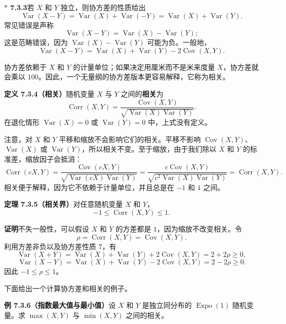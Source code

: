 \documentclass[UTF8,12pt,a4paper,fontset=fandol]{ctexart}
\newcommand{\biohazard}{\ensuremath{\ast}}
\begin{document}
\noindent\textbf{$\biohazard$ 7.3.3}\quad 若 $X$ 和 $Y$ 独立，则协方差的性质给出
\[
  \operatorname{Var}(X-Y)=\operatorname{Var}(X)+\operatorname{Var}(-Y)
  =\operatorname{Var}(X)+\operatorname{Var}(Y).
\]
常见错误是声称
\[
  \operatorname{Var}(X-Y)=\operatorname{Var}(X)-\operatorname{Var}(Y);
\]
这是范畴错误，因为 $\operatorname{Var}(X)-\operatorname{Var}(Y)$ 可能为负。一般地，
\[
  \operatorname{Var}(X-Y)=\operatorname{Var}(X)+\operatorname{Var}(Y)-2\operatorname{Cov}(X,Y).
\]

协方差依赖于 $X$ 和 $Y$ 的计量单位；如果决定用厘米而不是米来度量 $X$，协方差就会乘以 $100$。因此，一个无量纲的协方差版本更容易解释，它称为相关。

\noindent\textbf{定义 7.3.4（相关）}\quad 随机变量 $X$ 与 $Y$ 之间的\textbf{相关}为
\[
  \operatorname{Corr}(X,Y)
  =\frac{\operatorname{Cov}(X,Y)}
  {\sqrt{\operatorname{Var}(X)\operatorname{Var}(Y)}}.
\]
在退化情形 $\operatorname{Var}(X)=0$ 或 $\operatorname{Var}(Y)=0$ 中，上式没有定义。

注意，对 $X$ 和 $Y$ 平移和缩放不会影响它们的相关。平移不影响 $\operatorname{Cov}(X,Y)$、$\operatorname{Var}(X)$ 或 $\operatorname{Var}(Y)$，所以相关不变。至于缩放，由于我们除以 $X$ 和 $Y$ 的标准差，缩放因子会抵消：
\[
  \operatorname{Corr}(cX,Y)
  =\frac{\operatorname{Cov}(cX,Y)}
  {\sqrt{\operatorname{Var}(cX)\operatorname{Var}(Y)}}
  =\frac{c\operatorname{Cov}(X,Y)}
  {\sqrt{c^2\operatorname{Var}(X)\operatorname{Var}(Y)}}
  =\operatorname{Corr}(X,Y).
\]
相关便于解释，因为它不依赖于计量单位，并且总是在 $-1$ 和 $1$ 之间。

\noindent\textbf{定理 7.3.5（相关界）}\quad 对任意随机变量 $X$ 和 $Y$，
\[
  -1\le \operatorname{Corr}(X,Y)\le 1.
\]

\noindent\textbf{证明}\quad 不失一般性，可以假设 $X$ 和 $Y$ 的方差都是 $1$，因为缩放不改变相关。令
\[
  \rho=\operatorname{Corr}(X,Y)=\operatorname{Cov}(X,Y).
\]
利用方差非负以及协方差性质 7，有
\[
  \operatorname{Var}(X+Y)
  =\operatorname{Var}(X)+\operatorname{Var}(Y)+2\operatorname{Cov}(X,Y)
  =2+2\rho\ge 0,
\]
\[
  \operatorname{Var}(X-Y)
  =\operatorname{Var}(X)+\operatorname{Var}(Y)-2\operatorname{Cov}(X,Y)
  =2-2\rho\ge 0.
\]
因此 $-1\le \rho\le 1$。

下面给出一个计算协方差和相关的例子。

\noindent\textbf{例 7.3.6（指数最大值与最小值）}\quad 设 $X$ 和 $Y$ 是独立同分布的 $\operatorname{Expo}(1)$ 随机变量。求 $\max(X,Y)$ 与 $\min(X,Y)$ 之间的相关。
\end{document}
